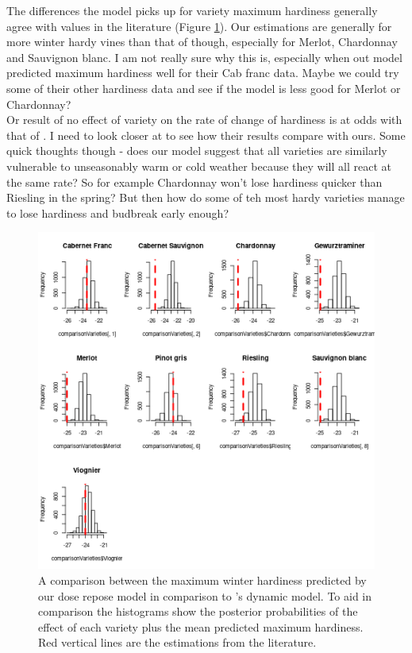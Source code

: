 \documentclass[11pt,letter]{article}
\begin{document}
The differences the model picks up for variety maximum hardiness generally agree with values in the literature (Figure \ref{fig:compareFerg}). Our estimations are generally for more winter hardy vines than that of \cite{Ferguson2014} though, especially for Merlot, Chardonnay and Sauvignon blanc. I am not really sure why this is, especially when out model predicted maximum hardiness well for their Cab franc data. Maybe we could try some of their other hardiness data and see if the model is less good for Merlot or Chardonnay?\\
Or result of no effect of variety on the rate of change of hardiness is at odds with that of \cite{Ferguson2014}. I need to look closer at \cite{Kovaleski2018a,Kovaleski2019} to see how their results compare with ours. Some quick thoughts though - does our model suggest that all varieties are similarly vulnerable to unseasonably warm or cold weather because they will all react at the same rate? So for example Chardonnay won't lose hardiness quicker than Riesling in the spring? But then how do some of teh most hardy varieties manage to lose hardiness and budbreak early enough?\\

\begin{figure}
  \includegraphics[scale = 0.75]{compareFerg.png}
  \caption{A comparison between the maximum winter hardiness predicted by our dose repose model in comparison to \cite{Ferguson2014}'s dynamic model. To aid in comparison the histograms show the posterior probabilities of the effect of each variety plus the mean predicted maximum hardiness. Red vertical lines are the estimations from the literature. }
  \label{fig:compareFerg}
\end{figure}
\end{document}
